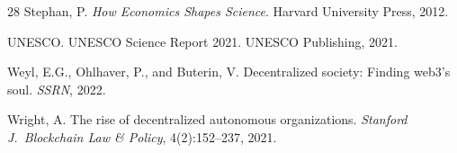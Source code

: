 \begin{thebibliography}{28}
Stephan, P.
\newblock \emph{How Economics Shapes Science}.
\newblock Harvard University Press, 2012.

UNESCO.
\newblock UNESCO Science Report 2021.
\newblock UNESCO Publishing, 2021.

Weyl, E.G., Ohlhaver, P., and Buterin, V.
\newblock Decentralized society: Finding web3's soul.
\newblock \emph{SSRN}, 2022.

Wright, A.
\newblock The rise of decentralized autonomous organizations.
\newblock \emph{Stanford J.\ Blockchain Law \& Policy}, 4(2):152--237, 2021.

\end{thebibliography}

